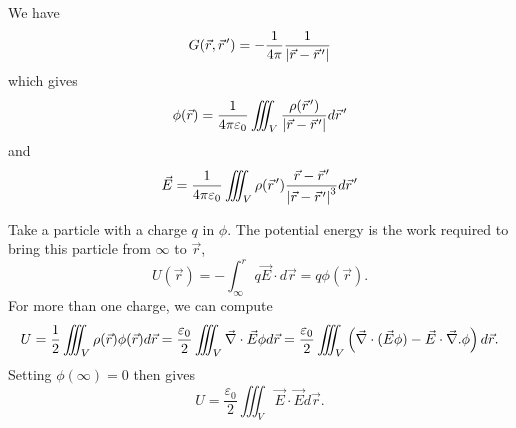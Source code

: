 We have
\[
  G(\vec{r}, \pvec{r}') = - \inv{4 \pi} \inv{\abs{\vec{r} - \pvec{r}'}}
\]
which gives
\[
  \phi(\vec{r}) = \inv{4 \pi \varepsilon_0} \iiint_V
  \frac{\rho(\pvec{r}')}{\abs{\vec{r} - \pvec{r}'}} d\pvec{r}'
\]
and
\[
  \vec{E} =
  \inv{4 \pi \varepsilon_0} \iiint_V \rho(\pvec{r}') \frac{\vec{r} -
	\pvec{r}'}{\abs{\vec{r} - \pvec{r}'}^3} d\pvec{r}'
\]

Take a particle with a charge $q$ in $\phi$.
The potential energy is the work required to bring this particle from $\infty$
to $\vec{r}$,
\[
  U(\vec{r})
  = - \int_{\infty}^r q \vec{E} \cdot d\vec{r}
  = q \phi(\vec{r}).
\]
For more than one charge, we can compute
\[
  U = \frac{1}{2} \iiint_V \rho(\vec{r}) \phi(\vec{r}) d\vec{r}
  = \frac{\varepsilon_0}{2} \iiint_V \vec{\nabla}{} \cdot \vec{E} \phi d\vec{r}
  = \frac{\varepsilon_0}{2} \iiint_V \left( \vec{\nabla}{} \cdot (\vec{E} \phi) - \vec{E} \cdot
	\vec{\nabla}{} . \phi \right) d\vec{r}.
\]
Setting $\phi(\infty) = 0$ then gives
\[
  U = \frac{\varepsilon_0}{2} \iiint_V \vec{E} \cdot \vec{E} d\vec{r}.
\]


